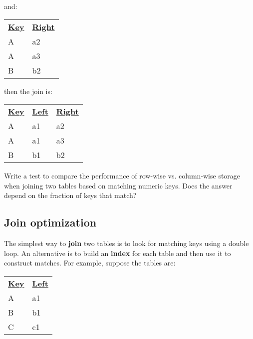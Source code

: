 \documentclass[krantzl]{krantz}
\newcommand{\glossref}[1]{\textbf{#1}}
\begin{document}
\vspace{\baselineskip}


\noindent and:


\vspace{\baselineskip}
\begin{tabular}{ll}
\textbf{\underline{Key}} & \textbf{\underline{Right}} \\
A & a2 \\
A & a3 \\
B & b2 \\
\end{tabular}

\vspace{\baselineskip}


\noindent then the join is:


\vspace{\baselineskip}
\begin{tabular}{lll}
\textbf{\underline{Key}} & \textbf{\underline{Left}} & \textbf{\underline{Right}} \\
A & a1 & a2 \\
A & a1 & a3 \\
B & b1 & b2 \\
\end{tabular}

\vspace{\baselineskip}


\noindent Write a test to compare the performance of row-wise vs. column-wise storage
when joining two tables based on matching numeric keys.
Does the answer depend on the fraction of keys that match?

\subsection*{Join optimization}


The simplest way to \glossref{join} two tables is
to look for matching keys using a double loop.
An alternative is to build an \glossref{index} for each table
and then use it to construct matches.
For example, suppose the tables are:


\vspace{\baselineskip}
\begin{tabular}{ll}
\textbf{\underline{Key}} & \textbf{\underline{Left}} \\
A & a1 \\
B & b1 \\
C & c1 \\
\end{tabular}
\end{document}
